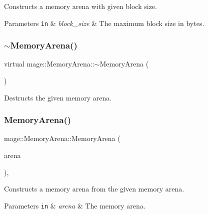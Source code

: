 Constructs a memory arena with given block size.


\begin{DoxyParams}[1]{Parameters}
\mbox{\tt in}  & {\em block\+\_\+size} & The maximum block size in bytes. \\
\hline
\end{DoxyParams}
\hypertarget{classmage_1_1_memory_arena_a2bea1690184d21f54a4fb815a86e0c27}{}\label{classmage_1_1_memory_arena_a2bea1690184d21f54a4fb815a86e0c27} 
\subsubsection{\texorpdfstring{$\sim$\+Memory\+Arena()}{~MemoryArena()}}
{\footnotesize\ttfamily virtual mage\+::\+Memory\+Arena\+::$\sim$\+Memory\+Arena (\begin{DoxyParamCaption}{ }\end{DoxyParamCaption})\hspace{0.3cm}{\ttfamily [virtual]}}

Destructs the given memory arena. \hypertarget{classmage_1_1_memory_arena_a1eca6fdacbd1226f4b21f443d118168b}{}\label{classmage_1_1_memory_arena_a1eca6fdacbd1226f4b21f443d118168b} 
\subsubsection{\texorpdfstring{Memory\+Arena()}{MemoryArena()}\hspace{0.1cm}{\footnotesize\ttfamily [2/2]}}
{\footnotesize\ttfamily mage\+::\+Memory\+Arena\+::\+Memory\+Arena (\begin{DoxyParamCaption}\item[{const \hyperlink{classmage_1_1_memory_arena}{Memory\+Arena} \&}]{arena }\end{DoxyParamCaption})\hspace{0.3cm}{\ttfamily [protected]}, {\ttfamily [delete]}}

Constructs a memory arena from the given memory arena.


\begin{DoxyParams}[1]{Parameters}
\mbox{\tt in}  & {\em arena} & The memory arena. \\
\hline
\end{DoxyParams}


